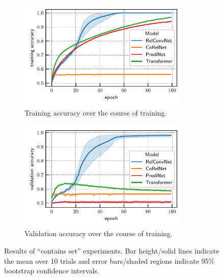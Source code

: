 \begin{figure}[ht]
    \begin{subfigure}[t]{0.45\textwidth}
        \centering
        \includegraphics[width=0.9\textwidth]{figs/experiments/contains_set_training_curves_trainacc.pdf}
        \caption{Training accuracy over the course of training.}\label{fig:contains_set_training_curves_trainacc}
    \end{subfigure}
    \begin{subfigure}[t]{0.45\textwidth}
        \centering
        \includegraphics[width=0.9\textwidth]{figs/experiments/contains_set_training_curves_valacc.pdf}
        \caption{Validation accuracy over the course of training.}\label{fig:contains_set_training_curves_valacc}
    \end{subfigure}
    \caption{Results of ``contains set'' experiments. Bar height/solid lines indicate the mean over 10 trials and error bars/shaded regions indicate 95\% bootstrap confidence intervals.}\label{fig:contains_set_training_curves}
\end{figure}

